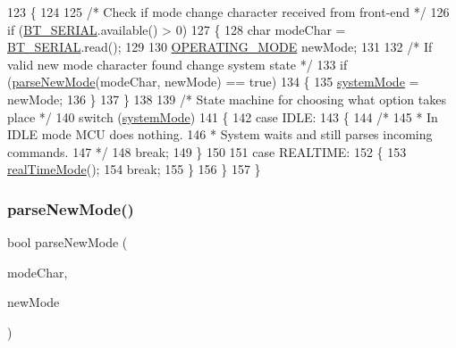 \begin{DoxyCode}
123 \{
124 
125   \textcolor{comment}{/* Check if mode change character received from front-end */}
126   \textcolor{keywordflow}{if} (\hyperlink{logging-device_8ino_ad1e6e6f6fc813b305067b9e1b0777ea6}{BT\_SERIAL}.available() > 0)
127   \{
128     \textcolor{keywordtype}{char} modeChar = \hyperlink{logging-device_8ino_ad1e6e6f6fc813b305067b9e1b0777ea6}{BT\_SERIAL}.read();
129 
130     \hyperlink{logging-device_8ino_a980e950615d86dadef54f3cfaefb5fb4}{OPERATING\_MODE} newMode;
131 
132     \textcolor{comment}{/* If valid new mode character found change system state */}
133     \textcolor{keywordflow}{if} (\hyperlink{logging-device_8ino_aec1eb39e3cfde6331c4d29938c952c84}{parseNewMode}(modeChar, newMode) == \textcolor{keyword}{true})
134     \{
135       \hyperlink{logging-device_8ino_a13a2ecbcf455940dd240e54e9e39cf7a}{systemMode} = newMode;
136     \}
137   \}
138 
139   \textcolor{comment}{/* State machine for choosing what option takes place */}
140   \textcolor{keywordflow}{switch} (\hyperlink{logging-device_8ino_a13a2ecbcf455940dd240e54e9e39cf7a}{systemMode})
141   \{
142     \textcolor{keywordflow}{case} IDLE:
143     \{
144       \textcolor{comment}{/*}
145 \textcolor{comment}{       * In IDLE mode MCU does nothing.}
146 \textcolor{comment}{       * System waits and still parses incoming commands.}
147 \textcolor{comment}{       */}
148       \textcolor{keywordflow}{break};
149     \}
150 
151     \textcolor{keywordflow}{case} REALTIME:
152     \{
153       \hyperlink{logging-device_8ino_ab4c1c4c0fa047e336f9f4176406a54f1}{realTimeMode}();
154       \textcolor{keywordflow}{break};
155     \}
156   \}
157 \}
\end{DoxyCode}
\mbox{\label{logging-device_8ino_aec1eb39e3cfde6331c4d29938c952c84}} 
\subsubsection{\texorpdfstring{parse\+New\+Mode()}{parseNewMode()}}
{\footnotesize\ttfamily bool parse\+New\+Mode (\begin{DoxyParamCaption}\item[{char}]{mode\+Char,  }\item[{\hyperlink{logging-device_8ino_a980e950615d86dadef54f3cfaefb5fb4}{O\+P\+E\+R\+A\+T\+I\+N\+G\+\_\+\+M\+O\+DE} \&}]{new\+Mode }\end{DoxyParamCaption})}



